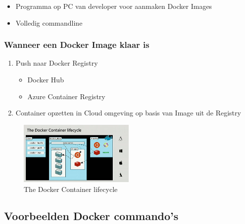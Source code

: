 \documentclass{article}
\begin{document}
\begin{itemize}
    \item Programma op PC van developer voor aanmaken Docker Images
    \item Volledig commandline
\end{itemize}

\subsubsection{Wanneer een Docker Image klaar is}

\begin{enumerate}
    \item Push naar Docker Registry
    \begin{itemize}
        \item Docker Hub
        \item Azure Container Registry
    \end{itemize}
    \item Container opzetten in Cloud omgeving op basis van Image uit de Registry
\end{enumerate}

\begin{figure}[H]
    \centering
    \includegraphics[width=0.5\textwidth]{docker-container-lifecycle.png}
    \caption{The Docker Container lifecycle}
\end{figure}

\subsection{Voorbeelden Docker commando's}
\end{document}

